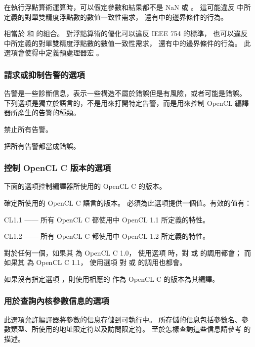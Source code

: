 在執行浮點算術運算時，可以假定參數和結果都不是 NaN 或 \math{\pm\infty}。
這可能違反 中所定義的對單雙精度浮點數的數值一致性需求，
還有中的邊界條件的行為。
\stopclOption

相當於  和  的組合。
對浮點算術的優化可以違反 IEEE 754 的標準，
也可以違反 中所定義的對單雙精度浮點數的數值一致性需求，
還有中的邊界條件的行為。
此選項會使得中定義預處理器宏 。
\stopclOption

\subsubsection{請求或抑制告警的選項}

告警是一些診斷信息，表示一些構造不屬於錯誤但是有風險，或者可能是錯誤。
下列選項是獨立於語言的，不是用來打開特定告警，而是用來控制 OpenCL 編譯器所產生的告警的種類。

禁止所有告警。
\stopclOption

把所有告警都當成錯誤。
\stopclOption

\subsubsection[sec:ctrlcveroption]{控制 OpenCL C 版本的選項}

下面的選項控制編譯器所使用的 OpenCL C 的版本。

確定所使用的 OpenCL C 語言的版本。
必須為此選項提供一個值。有效的值有：
\startigBase
\item CL1.1 —— 所有 OpenCL C 都使用中 OpenCL 1.1 所定義的特性。
\item CL1.2 —— 所有 OpenCL C 都使用中 OpenCL 1.2 所定義的特性。
\stopigBase
\stopclOption

對於任何一個，如果其  為 OpenCL C 1.0，
使用選項  時，對  或  的調用都會{}；
而如果其  為 OpenCL C 1.1，
使用選項  對  或  的調用也都會{}。

如果沒有指定選項 ，則使用相應的  作為 OpenCL C 的版本為其編譯。

\subsubsection{用於查詢內核參數信息的選項}

此選項允許編譯器將參數的信息存儲到可執行中。
所存儲的信息包括參數名、參數類型、所使用的地址限定符以及訪問限定符。
至於怎樣查詢這些信息請參考  的描述。
\stopclOption

